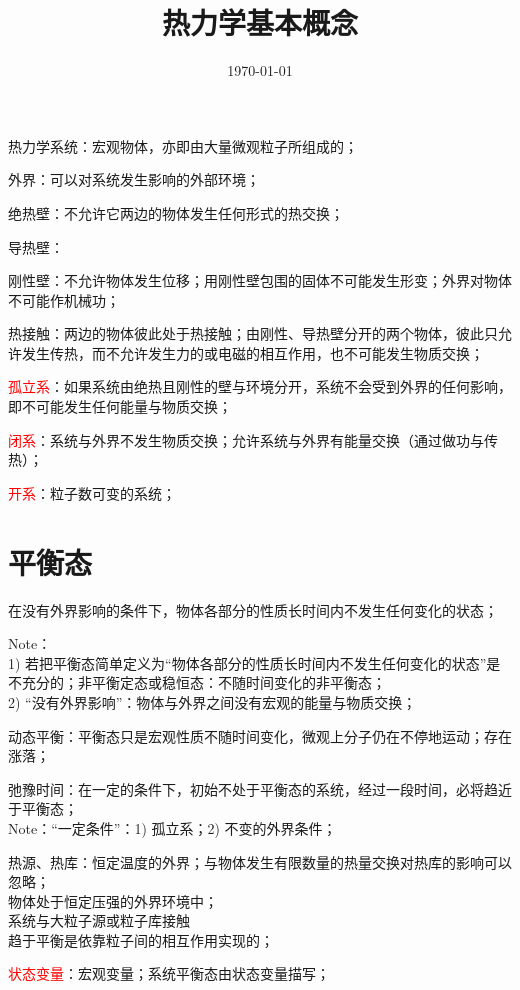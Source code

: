 \documentclass[12pt,a4paper]{article}
\title{热力学基本概念}
\author{}
\date{\today}
\begin{document}
\maketitle

热力学系统：宏观物体，亦即由大量微观粒子所组成的；

外界：可以对系统发生影响的外部环境；

绝热壁：不允许它两边的物体发生任何形式的热交换；

导热壁：

刚性壁：不允许物体发生位移；用刚性壁包围的固体不可能发生形变；外界对物体不可能作机械功；

热接触：两边的物体彼此处于热接触；由刚性、导热壁分开的两个物体，彼此只允许发生传热，而不允许发生力的或电磁的相互作用，也不可能发生物质交换；

\textcolor{red}{孤立系}：如果系统由绝热且刚性的壁与环境分开，系统不会受到外界的任何影响，即不可能发生任何能量与物质交换；

\textcolor{red}{闭系}：系统与外界不发生物质交换；允许系统与外界有能量交换（通过做功与传热）；

\textcolor{red}{开系}：粒子数可变的系统；

\section{平衡态}

在没有外界影响的条件下，物体各部分的性质长时间内不发生任何变化的状态；

Note：\\
1) 若把平衡态简单定义为“物体各部分的性质长时间内不发生任何变化的状态”是不充分的；非平衡定态或稳恒态：不随时间变化的非平衡态；\\
2) “没有外界影响”：物体与外界之间没有宏观的能量与物质交换；

动态平衡：平衡态只是宏观性质不随时间变化，微观上分子仍在不停地运动；存在涨落；

弛豫时间：在一定的条件下，初始不处于平衡态的系统，经过一段时间，必将趋近于平衡态；\\
Note：“一定条件”：1) 孤立系；2) 不变的外界条件；

热源、热库：恒定温度的外界；与物体发生有限数量的热量交换对热库的影响可以忽略；\\
物体处于恒定压强的外界环境中；\\
系统与大粒子源或粒子库接触\\
趋于平衡是依靠粒子间的相互作用实现的；

\textcolor{red}{状态变量}：宏观变量；系统平衡态由状态变量描写；
\end{document}
